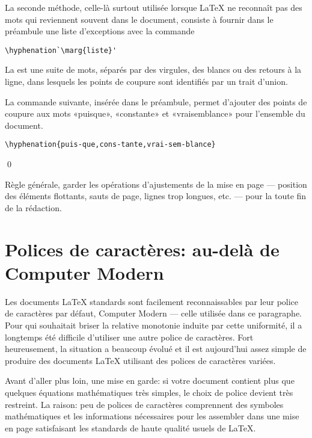 La seconde méthode, celle-là surtout utilisée lorsque {\LaTeX} ne
reconnaît pas des mots qui reviennent souvent dans le document,
consiste à fournir dans le préambule une liste d'exceptions avec la
commande
\begin{lstlisting}
\hyphenation`\marg{liste}'
\end{lstlisting}
La  est une suite de mots, séparés par des virgules, des
blancs ou des retours à la ligne, dans lesquels les points de coupure
sont identifiés par un trait d'union.

\begin{exemple}
  La commande suivante, insérée dans le préambule, permet d'ajouter
  des points de coupure aux mots «puisque», «constante» et
  «vraisemblance» pour l'ensemble du document.
\begin{lstlisting}
\hyphenation{puis-que,cons-tante,vrai-sem-blance}
\end{lstlisting}
  \qed
\end{exemple}

\begin{important}
  Règle générale, garder les opérations d'ajustements de la mise en
  page --- position des éléments flottants, sauts de page, lignes trop
  longues, etc. --- pour la toute fin de la rédaction.
\end{important}


\section{Polices de caractères: au-delà de Computer Modern}
\label{sec:trucs:police}

{\CM%
  Les documents {\LaTeX} standards sont facilement reconnaissables par
  leur police de caractères par défaut, Computer Modern --- celle
  utilisée dans ce paragraphe. Pour qui souhaitait briser la relative
  monotonie induite par cette uniformité, il a longtemps été difficile
  d'utiliser une autre police de caractères. Fort heureusement, la
  situation a beaucoup évolué et il est aujourd'hui assez simple de
  produire des documents {\LaTeX} utilisant des polices de caractères
  variées.}

Avant d'aller plus loin, une mise en garde: si votre document contient
plus que quelques équations mathématiques très simples, le choix de
police devient très restreint. La raison: peu de polices de caractères
comprennent des symboles mathématiques et les informations nécessaires
pour les assembler dans une mise en page satisfaisant les standards de
haute qualité usuels de {\LaTeX}.

